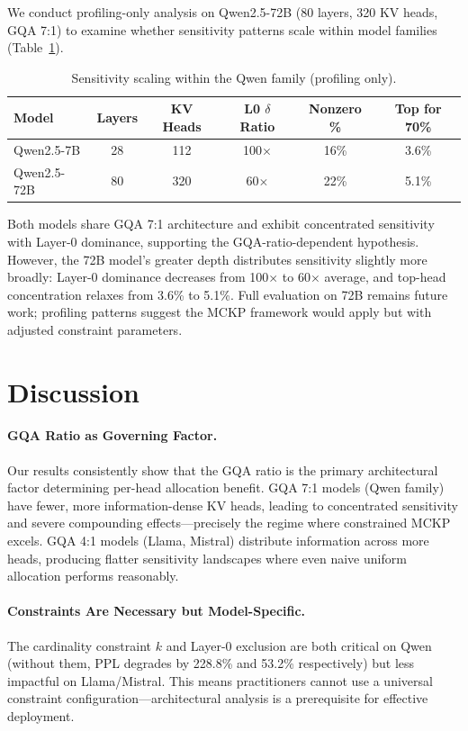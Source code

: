 \documentclass[11pt]{article}
\begin{document}
We conduct profiling-only analysis on Qwen2.5-72B (80 layers, 320 KV heads, GQA 7:1) to examine whether sensitivity patterns scale within model families (Table~\ref{tab:scale}).

\begin{table}[h]
\centering
\caption{Sensitivity scaling within the Qwen family (profiling only).}
\label{tab:scale}
\begin{tabular}{lccccc}
\toprule
\textbf{Model} & \textbf{Layers} & \textbf{KV Heads} & \textbf{L0 $\delta$ Ratio} & \textbf{Nonzero \%} & \textbf{Top for 70\%} \\
\midrule
Qwen2.5-7B  & 28 & 112 & 100$\times$ & 16\% & 3.6\% \\
Qwen2.5-72B & 80 & 320 & 60$\times$  & 22\% & 5.1\% \\
\bottomrule
\end{tabular}
\end{table}

Both models share GQA 7:1 architecture and exhibit concentrated sensitivity with Layer-0 dominance, supporting the GQA-ratio-dependent hypothesis.
However, the 72B model's greater depth distributes sensitivity slightly more broadly: Layer-0 dominance decreases from 100$\times$ to 60$\times$ average, and top-head concentration relaxes from 3.6\% to 5.1\%.
Full evaluation on 72B remains future work; profiling patterns suggest the MCKP framework would apply but with adjusted constraint parameters.

\section{Discussion}

\paragraph{GQA Ratio as Governing Factor.}
Our results consistently show that the GQA ratio is the primary architectural factor determining per-head allocation benefit.
GQA 7:1 models (Qwen family) have fewer, more information-dense KV heads, leading to concentrated sensitivity and severe compounding effects---precisely the regime where constrained MCKP excels.
GQA 4:1 models (Llama, Mistral) distribute information across more heads, producing flatter sensitivity landscapes where even naive uniform allocation performs reasonably.

\paragraph{Constraints Are Necessary but Model-Specific.}
The cardinality constraint $k$ and Layer-0 exclusion are both critical on Qwen (without them, PPL degrades by 228.8\% and 53.2\% respectively) but less impactful on Llama/Mistral.
This means practitioners cannot use a universal constraint configuration---architectural analysis is a prerequisite for effective deployment.
\end{document}
